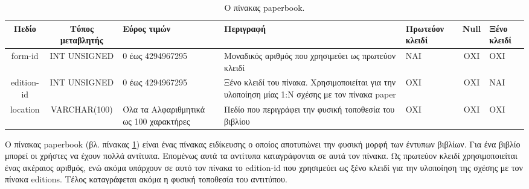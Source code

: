 \documentclass{assignment}
\begin{document}
\begin{landscape}
\begin{table}[htbp]
\begin{center}
  \begin{tabular}{|c|c|m{}|m{}|m{2.0cm}|c|m{1.5cm}|}
    \hline
    {\bf Πεδίο} & {\bf Τύπος μεταβλητής} & {\bf Εύρος τιμών} & {\bf Περιγραφή} & {\bf Πρωτεύον κλειδί} & {\bf Null} & {\bf Ξένο κλειδί} \\ \hline
    form-id & INT UNSIGNED & 0 έως 4294967295 & Μοναδικός αριθμός που χρησιμεύει ως πρωτεύον κλειδί & ΝΑΙ & ΟΧΙ & ΟΧΙ \\ \hline
    edition-id & INT UNSIGNED & 0 έως 4294967295 & Ξένο κλειδί του πίνακα. Χρησιμοποιείται για την υλοποίηση μίας 1:Ν σχέσης με τον πίνακα paper & OXI & ΟΧΙ & NAI \\ \hline
    location & VARCHAR(100) &  Όλα τα Αλφαριθμητικά ως 100 χαρακτήρες & Πεδίο που περιγράφει την φυσική τοποθεσία του βιβλίου & OXI & ΟΧΙ & ΟΧΙ \\ \hline
  \end{tabular}
\caption{Ο πίνακας paperbook.}
\label{table:db_table:paperbook}
\end{center}
\end{table}

Ο πίνακας paperbook (βλ. πίνακας \ref{table:db_table:paperbook}) είναι ένας πίνακας ειδίκευσης ο οποίος αποτυπώνει την φυσική μορφή των έντυπων βιβλίων. Για ένα βιβλίο μπορεί οι χρήστες να έχουν πολλά αντίτυπα. Επομένως αυτά τα αντίτυπα καταγράφονται σε αυτά τον πίνακα. Ως πρωτεύον κλειδί χρησιμοποιείται ένας ακέραιος αριθμός, ενώ ακόμα υπάρχουν σε αυτό τον πίνακα το edition-id που χρησιμεύει ως ξένο κλειδί για την υλοποίηση της σχέσης με τον πίνακα editions. Τέλος καταγράφεται ακόμα η φυσική τοποθεσία του αντιτύπου.
\end{landscape}
\end{document}
